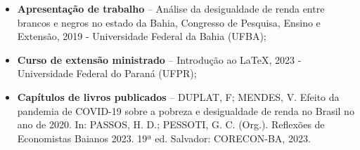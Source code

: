 \documentclass[10pt,a4paper]{cv}
\begin{document}


\divider


\divider





\begin{itemize}
  \item \textbf{Apresentação de trabalho} -- Análise da desigualdade de renda entre brancos e negros no estado da Bahia, Congresso de Pesquisa, Ensino e Extensão, 2019 - Universidade Federal da Bahia (UFBA);
  
  \item \textbf{Curso de extensão ministrado} -- Introdução ao \LaTeX{}, 2023 - Universidade Federal do Paraná (UFPR);
  
  \item \textbf{Capítulos de livros publicados} -- DUPLAT, F; MENDES, V. Efeito da pandemia de COVID-19 sobre a pobreza e desigualdade de renda no Brasil no ano de 2020. In: PASSOS, H. D.; PESSOTI, G. C. (Org.). Reflexões de Economistas Baianos 2023. 19ª ed. Salvador: CORECON-BA, 2023.
\end{itemize}








\end{document}
